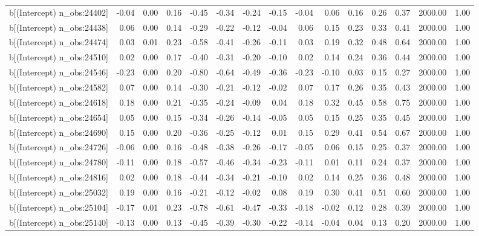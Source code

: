 \begin{table}[ht]
\begin{tabular}{rrrrrrrrrrrrrrr}
  b[(Intercept) n\_obs:24402] & -0.04 & 0.00 & 0.16 & -0.45 & -0.34 & -0.24 & -0.15 & -0.04 & 0.06 & 0.16 & 0.26 & 0.37 & 2000.00 & 1.00 \\ 
  b[(Intercept) n\_obs:24438] & 0.06 & 0.00 & 0.14 & -0.29 & -0.22 & -0.12 & -0.04 & 0.06 & 0.15 & 0.23 & 0.33 & 0.41 & 2000.00 & 1.00 \\ 
  b[(Intercept) n\_obs:24474] & 0.03 & 0.01 & 0.23 & -0.58 & -0.41 & -0.26 & -0.11 & 0.03 & 0.19 & 0.32 & 0.48 & 0.64 & 2000.00 & 1.00 \\ 
  b[(Intercept) n\_obs:24510] & 0.02 & 0.00 & 0.17 & -0.40 & -0.31 & -0.20 & -0.10 & 0.02 & 0.14 & 0.24 & 0.36 & 0.44 & 2000.00 & 1.00 \\ 
  b[(Intercept) n\_obs:24546] & -0.23 & 0.00 & 0.20 & -0.80 & -0.64 & -0.49 & -0.36 & -0.23 & -0.10 & 0.03 & 0.15 & 0.27 & 2000.00 & 1.00 \\ 
  b[(Intercept) n\_obs:24582] & 0.07 & 0.00 & 0.14 & -0.30 & -0.21 & -0.12 & -0.02 & 0.07 & 0.17 & 0.26 & 0.35 & 0.43 & 2000.00 & 1.00 \\ 
  b[(Intercept) n\_obs:24618] & 0.18 & 0.00 & 0.21 & -0.35 & -0.24 & -0.09 & 0.04 & 0.18 & 0.32 & 0.45 & 0.58 & 0.75 & 2000.00 & 1.00 \\ 
  b[(Intercept) n\_obs:24654] & 0.05 & 0.00 & 0.15 & -0.34 & -0.26 & -0.14 & -0.05 & 0.05 & 0.15 & 0.25 & 0.35 & 0.45 & 2000.00 & 1.00 \\ 
  b[(Intercept) n\_obs:24690] & 0.15 & 0.00 & 0.20 & -0.36 & -0.25 & -0.12 & 0.01 & 0.15 & 0.29 & 0.41 & 0.54 & 0.67 & 2000.00 & 1.00 \\ 
  b[(Intercept) n\_obs:24726] & -0.06 & 0.00 & 0.16 & -0.48 & -0.38 & -0.26 & -0.17 & -0.05 & 0.06 & 0.15 & 0.25 & 0.37 & 2000.00 & 1.00 \\ 
  b[(Intercept) n\_obs:24780] & -0.11 & 0.00 & 0.18 & -0.57 & -0.46 & -0.34 & -0.23 & -0.11 & 0.01 & 0.11 & 0.24 & 0.37 & 2000.00 & 1.00 \\ 
  b[(Intercept) n\_obs:24816] & 0.02 & 0.00 & 0.18 & -0.44 & -0.34 & -0.21 & -0.10 & 0.02 & 0.14 & 0.25 & 0.36 & 0.48 & 2000.00 & 1.00 \\ 
  b[(Intercept) n\_obs:25032] & 0.19 & 0.00 & 0.16 & -0.21 & -0.12 & -0.02 & 0.08 & 0.19 & 0.30 & 0.41 & 0.51 & 0.60 & 2000.00 & 1.00 \\ 
  b[(Intercept) n\_obs:25104] & -0.17 & 0.01 & 0.23 & -0.78 & -0.61 & -0.47 & -0.33 & -0.18 & -0.02 & 0.12 & 0.28 & 0.39 & 2000.00 & 1.00 \\ 
  b[(Intercept) n\_obs:25140] & -0.13 & 0.00 & 0.13 & -0.45 & -0.39 & -0.30 & -0.22 & -0.14 & -0.04 & 0.04 & 0.13 & 0.20 & 2000.00 & 1.00 \\ 

\end{tabular}
\end{table}
